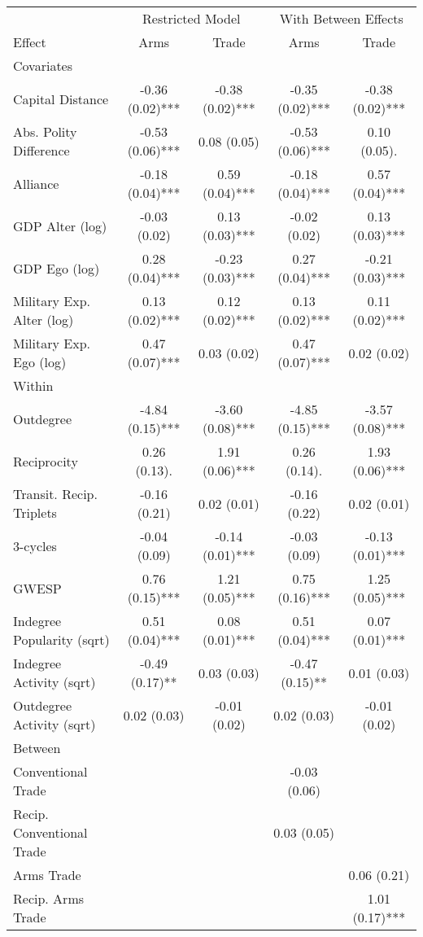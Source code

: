 \captionsetup[table]{labelformat=empty,skip=1pt}
\begin{longtable}{lcccc}
\toprule
 & \multicolumn{2}{c}{Restricted Model} & \multicolumn{2}{c}{With Between Effects} \\ 
 \cmidrule(lr){2-3} \cmidrule(lr){4-5}
Effect & Arms & Trade & Arms & Trade \\ 
\midrule
\multicolumn{1}{l}{Covariates} \\ 
\midrule
Capital Distance & -0.36 (0.02)*** & -0.38 (0.02)*** & -0.35 (0.02)*** & -0.38 (0.02)*** \\ 
Abs. Polity Difference & -0.53 (0.06)*** &  0.08 (0.05)    & -0.53 (0.06)*** &  0.10 (0.05).   \\ 
Alliance & -0.18 (0.04)*** &  0.59 (0.04)*** & -0.18 (0.04)*** &  0.57 (0.04)*** \\ 
GDP Alter (log) & -0.03 (0.02)    &  0.13 (0.03)*** & -0.02 (0.02)    &  0.13 (0.03)*** \\ 
GDP Ego (log) &  0.28 (0.04)*** & -0.23 (0.03)*** &  0.27 (0.04)*** & -0.21 (0.03)*** \\ 
Military Exp. Alter (log) &  0.13 (0.02)*** &  0.12 (0.02)*** &  0.13 (0.02)*** &  0.11 (0.02)*** \\ 
Military Exp. Ego (log) &  0.47 (0.07)*** &  0.03 (0.02)    &  0.47 (0.07)*** &  0.02 (0.02)    \\ 
\midrule
\multicolumn{1}{l}{Within} \\ 
\midrule
Outdegree & -4.84 (0.15)*** & -3.60 (0.08)*** & -4.85 (0.15)*** & -3.57 (0.08)*** \\ 
Reciprocity &  0.26 (0.13).   &  1.91 (0.06)*** &  0.26 (0.14).   &  1.93 (0.06)*** \\ 
Transit. Recip. Triplets & -0.16 (0.21)    &  0.02 (0.01)    & -0.16 (0.22)    &  0.02 (0.01)    \\ 
3-cycles & -0.04 (0.09)    & -0.14 (0.01)*** & -0.03 (0.09)    & -0.13 (0.01)*** \\ 
GWESP &  0.76 (0.15)*** &  1.21 (0.05)*** &  0.75 (0.16)*** &  1.25 (0.05)*** \\ 
Indegree Popularity (sqrt) &  0.51 (0.04)*** &  0.08 (0.01)*** &  0.51 (0.04)*** &  0.07 (0.01)*** \\ 
Indegree Activity (sqrt) & -0.49 (0.17)**  &  0.03 (0.03)    & -0.47 (0.15)**  &  0.01 (0.03)    \\ 
Outdegree Activity (sqrt) &  0.02 (0.03)    & -0.01 (0.02)    &  0.02 (0.03)    & -0.01 (0.02)    \\ 
\midrule
\multicolumn{1}{l}{Between} \\ 
\midrule
Conventional Trade &  &  & -0.03 (0.06)    &  \\ 
Recip. Conventional Trade &  &  &  0.03 (0.05)    &  \\ 
Arms Trade &  &  &  &  0.06 (0.21)    \\ 
Recip. Arms Trade &  &  &  &  1.01 (0.17)*** \\ 
 \bottomrule
\end{longtable}
